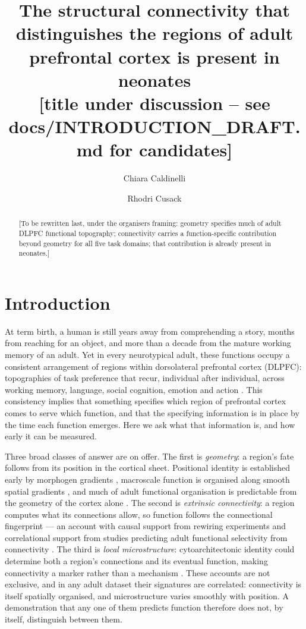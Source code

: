 \documentclass[11pt]{article}
\title{The structural connectivity that distinguishes the regions of adult
prefrontal cortex is present in neonates\\
\large [title under discussion -- see docs/INTRODUCTION\_DRAFT.md for candidates]}
\author{Chiara Caldinelli \and Rhodri Cusack}
\date{}
\begin{document}
\maketitle
\linenumbers
\onehalfspacing

\begin{abstract}
[To be rewritten last, under the organisers framing: geometry specifies much
of adult DLPFC functional topography; connectivity carries a function-specific
contribution beyond geometry for all five task domains; that contribution is
already present in neonates.]
\end{abstract}

\section{Introduction}

At term birth, a human is still years away from comprehending a story, months
from reaching for an object, and more than a decade from the mature working
memory of an adult. Yet in every neurotypical adult, these functions occupy a
consistent arrangement of regions within dorsolateral prefrontal cortex
(DLPFC): topographies of task preference that recur, individual after
individual, across working memory, language, social cognition, emotion and
action \citep{barch2013,glasser2016}. This consistency implies that something
specifies which region of prefrontal cortex comes to serve which function, and
that the specifying information is in place by the time each function
emerges. Here we ask what that information is, and how early it can be
measured.

Three broad classes of answer are on offer. The first is \emph{geometry}: a
region's fate follows from its position in the cortical sheet. Positional
identity is established early by morphogen gradients
\citep{rakic1988,oleary1989}, macroscale function is organised along smooth
spatial gradients \citep{margulies2016}, and much of adult functional
organisation is predictable from the geometry of the cortex alone
\citep{pang2023}. The second is \emph{extrinsic connectivity}: a region
computes what its connections allow, so function follows the connectional
fingerprint \citep{passingham2002} --- an account with causal support from
rewiring experiments \citep{vonmelchner2000} and correlational support from
studies predicting adult functional selectivity from connectivity
\citep{saygin2011,osher2016}. The third is \emph{local microstructure}:
cytoarchitectonic identity could determine both a region's connections and
its eventual function, making connectivity a marker rather than a mechanism
\citep{kubota2025}. These accounts are not exclusive, and in any adult
dataset their signatures are correlated: connectivity is itself spatially
organised, and microstructure varies smoothly with position. A demonstration
that any one of them predicts function therefore does not, by itself,
distinguish between them.
\end{document}
